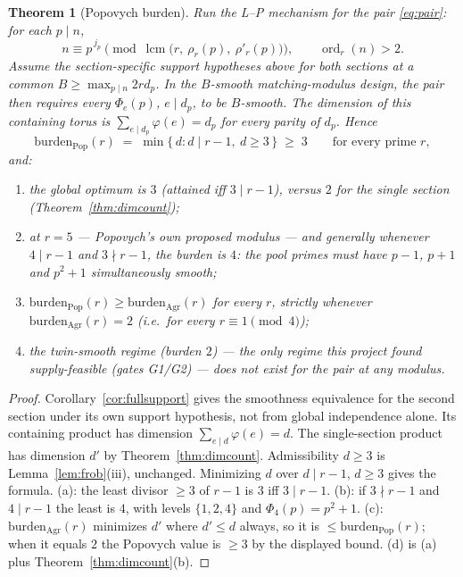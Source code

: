 \documentclass[11pt]{article}
\newtheorem{theorem}{Theorem}[section]
\theoremstyle{remark}
\DeclareMathOperator{\lcm}{lcm}
\DeclareMathOperator{\ord}{ord}
\begin{document}
\begin{theorem}[Popovych burden]\label{thm:popburden}
Run the L--P mechanism for the pair \eqref{eq:pair}: for each $p \mid n$,
\[
n \equiv p^{\,j_p} \pmod{\lcm\bigl(r,\ \rho_r(p),\ \rho'_r(p)\bigr)},
\qquad \ord_r(n) > 2 .
\]
Assume the section-specific support hypotheses above for both sections at a
common $B\ge\max_{p\mid n}2rd_p$. In the $B$-smooth matching-modulus design,
the pair then requires every $\Phi_e(p)$, $e\mid d_p$, to be $B$-smooth.
The dimension of this containing torus is
$\sum_{e \mid d_p} \varphi(e) = d_p$ for \emph{every} parity of $d_p$.
Hence
\[
\mathrm{burden}_{\mathrm{Pop}}(r) \;=\; \min\{\, d : d \mid r-1,\ d \ge 3
\,\} \;\ge\; 3 \qquad \text{for every prime } r,
\]
and:
\begin{enumerate}
\item[(a)] the global optimum is $3$ (attained iff $3 \mid r-1$), versus
$2$ for the single section (Theorem~\ref{thm:dimcount});
\item[(b)] at $r = 5$ --- Popovych's own proposed modulus --- and generally
whenever $4 \mid r - 1$ and $3 \nmid r-1$, the burden is $4$: the pool
primes must have $p-1$, $p+1$ \emph{and} $p^2+1$ simultaneously smooth;
\item[(c)] $\mathrm{burden}_{\mathrm{Pop}}(r) \ge
\mathrm{burden}_{\mathrm{Agr}}(r)$ for every $r$, strictly whenever
$\mathrm{burden}_{\mathrm{Agr}}(r) = 2$ (i.e.\ for every $r \equiv 1
\pmod 4$);
\item[(d)] the twin-smooth regime (burden $2$) --- the only regime this
project found supply-feasible (gates G1/G2) --- does not exist for the pair
at any modulus.
\end{enumerate}
\end{theorem}

\begin{proof}
Corollary~\ref{cor:fullsupport} gives the smoothness equivalence for the
second section under its own support hypothesis, not from global
independence alone. Its containing product has dimension
$\sum_{e\mid d}\varphi(e)=d$. The single-section product has dimension
$d'$ by Theorem~\ref{thm:dimcount}.
Admissibility $d \ge 3$ is Lemma~\ref{lem:frob}(iii), unchanged.
Minimizing $d$ over $d \mid r-1$, $d \ge 3$ gives the formula. (a): the
least divisor $\ge 3$ of $r-1$ is $3$ iff $3 \mid r-1$. (b): if
$3 \nmid r-1$ and $4 \mid r-1$ the least is $4$, with levels
$\{1,2,4\}$ and $\Phi_4(p) = p^2+1$. (c):
$\mathrm{burden}_{\mathrm{Agr}}(r)$ minimizes $d'$ where $d' \le d$
always, so it is $\le \mathrm{burden}_{\mathrm{Pop}}(r)$; when it equals
$2$ the Popovych value is $\ge 3$ by the displayed bound. (d) is (a) plus
Theorem~\ref{thm:dimcount}(b).
\end{proof}
\end{document}
